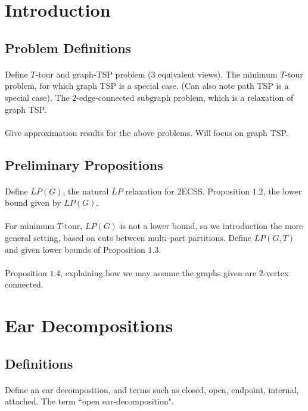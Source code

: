 \documentclass[letterpaper,12pt,oneside,onecolumn]{article}
\begin{document}
\section{Introduction}
\subsection{Problem Definitions}
\paragraph{} Define $T$-tour and graph-TSP problem ($3$ equivalent views). The minimum $T$-tour problem, for which graph TSP is a special case. (Can also note path TSP is a special case). The $2$-edge-connected subgraph problem, which is a relaxation of graph TSP.
\paragraph{} Give approximation results for the above problems. Will focus on graph TSP.
\subsection{Preliminary Propositions}
\paragraph{}
Define $LP(G)$, the natural $LP$ relaxation for 2ECSS. Proposition $1.2$, the lower bound given by $LP(G)$.
\paragraph{}
For minimum $T$-tour, $LP(G)$ is not a lower bound, so we introduction the more general setting, based on cuts between multi-part partitions. Define $LP(G,T)$ and given lower bounds of Proposition $1.3$.
\paragraph{}
Proposition $1.4$, explaining how we may assume the graphs given are $2$-vertex connected.
\section{Ear Decompositions}
\subsection{Definitions}
\paragraph{}
Define an ear decomposition, and terms such as closed, open, endpoint, internal, attached. The term ``open ear-decomposition".
\end{document}
